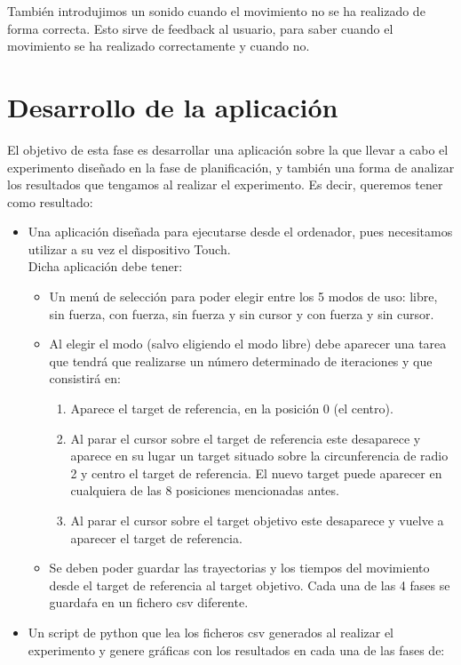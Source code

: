 \documentclass[a4paper,11pt, oneside]{book}
\begin{document}
También introdujimos un sonido cuando el movimiento no se ha realizado de forma correcta. Esto sirve de feedback al usuario, para saber cuando el movimiento se ha realizado correctamente y cuando no. 


\section{Desarrollo de la aplicación}

El objetivo de esta fase es desarrollar una aplicación sobre la que llevar a cabo el experimento diseñado en la fase de planificación, y también una forma de analizar los resultados que tengamos al realizar el experimento. Es decir, queremos tener como resultado:
\begin{itemize}
	\item Una aplicación diseñada para ejecutarse desde el ordenador, pues necesitamos utilizar a su vez el dispositivo Touch. \\
	Dicha aplicación debe tener:
	\begin{itemize}
		\item Un menú de selección para poder elegir entre los 5 modos de uso: libre, sin fuerza, con fuerza, sin fuerza y sin cursor y con fuerza y sin cursor.
		\item Al elegir el modo (salvo eligiendo el modo libre) debe aparecer una tarea que tendrá que realizarse un número determinado de iteraciones y que consistirá en:
		\begin{enumerate}
			\item Aparece el target de referencia, en la posición 0 (el centro).
			\item Al parar el cursor sobre el target de referencia este desaparece y aparece en su lugar un target situado sobre la circunferencia de radio 2 y centro el target de referencia. El nuevo target puede aparecer en cualquiera de las 8 posiciones mencionadas antes.
			\item Al parar el cursor sobre el target objetivo este desaparece y vuelve a aparecer el target de referencia.
		\end{enumerate}
		\item Se deben poder guardar las trayectorias y los tiempos del movimiento desde el target de referencia al target objetivo. Cada una de las 4 fases se guardaŕa en un fichero csv diferente.
	\end{itemize}
	\item Un script de python que lea los ficheros csv generados al realizar el experimento y genere gráficas con los resultados en cada una de las fases de:

\end{itemize}
\end{document}

